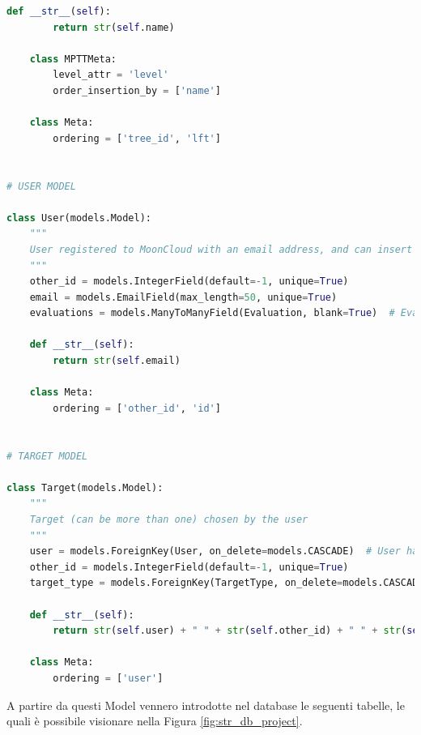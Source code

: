 \begin{lstlisting}[language=Python, label=lst:model, caption={Parti principali del codice dei Models della soluzione.}]
    def __str__(self):
        return str(self.name)

    class MPTTMeta:
        level_attr = 'level'
        order_insertion_by = ['name']

    class Meta:
        ordering = ['tree_id', 'lft']


# USER MODEL

class User(models.Model):
    """
    User registered to MoonCloud with an email address, and can insert Target and launch Evaluations
    """
    other_id = models.IntegerField(default=-1, unique=True)
    email = models.EmailField(max_length=50, unique=True)
    evaluations = models.ManyToManyField(Evaluation, blank=True)  # Evaluations chosen by user

    def __str__(self):
        return str(self.email)

    class Meta:
        ordering = ['other_id', 'id']


# TARGET MODEL

class Target(models.Model):
    """
    Target (can be more than one) chosen by the user
    """
    user = models.ForeignKey(User, on_delete=models.CASCADE)  # User has chosen a target_type
    other_id = models.IntegerField(default=-1, unique=True)
    target_type = models.ForeignKey(TargetType, on_delete=models.CASCADE)  # TargetType Id

    def __str__(self):
        return str(self.user) + " " + str(self.other_id) + " " + str(self.target_type)

    class Meta:
        ordering = ['user']
\end{lstlisting}
%
A partire da questi Model vennero introdotte nel database le seguenti tabelle, le quali è possibile visionare nella Figura 
\ref{fig:str_db_project}.
